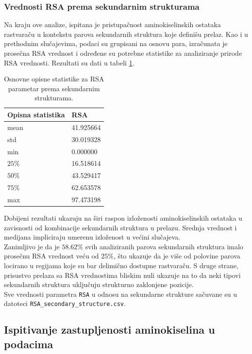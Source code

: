 \documentclass[a4paper,12pt]{article}
\begin{document}
\subsubsection{Vrednosti RSA prema sekundarnim strukturama}
Na kraju ove analize, ispitana je pristupačnost aminokiselinskih ostataka rastvaraču u kontekstu parova sekundarnih struktura koje definišu prelaz. Kao i u prethodnim slučajevima, podaci su grupisani na osnovu para, izračunata je prosečna RSA vrednost i određene su potrebne statistike za analiziranje prirode RSA vrednosti. Rezultati su dati u tabeli \ref{Tabela:12}.
\begin{table}[h!]
    \centering
    \begin{tabular}{ |l|l| } 
    \hline
    \textbf{Opisna statistika} & \textbf{RSA} \\
    \hline
    mean & 41.925664 \\
    std  & 30.019328 \\
    min  & 0.000000 \\
    $25\%$  & 16.518614 \\
    $50\%$  & 43.529417 	\\
    $75\%$ & 62.653578\\
    max & 97.473198 	\\
    \hline
    \end{tabular}
    \caption{Osnovne opisne statistike za RSA parametar prema sekundarnim strukturama.}
    \label{Tabela:12}
\end{table}

Dobijeni rezultati ukazuju na širi raspon izloženosti aminokiselinskih ostataka u zavisnosti od kombinacije sekundarnih struktura u prelazu. Srednja vrednost i medijana impliciraju umerenu izloženost u većini slučajeva. \\
Zanimljivo je da je $58.62\%$ svih analiziranih parova sekundarnih struktura imalo prosečnu RSA vrednost veću od $25\%$, što ukazuje da je više od polovine parova locirano u regijama koje su bar delimično dostupne rastvaraču. S druge strane, prisustvo prelaza sa RSA vrednostima bliskim nuli ukazuje na to da neki tipovi sekundarnih struktura uključuju strukturno zaklonjene pozicije. \\
Sve vrednosti parametra \texttt{RSA} u odnosu na sekundarne strukture sačuvane su u datoteci \texttt{RSA\_secondary\_structure.csv}.
\subsection{Ispitivanje zastupljenosti aminokiselina u podacima}
\end{document}
